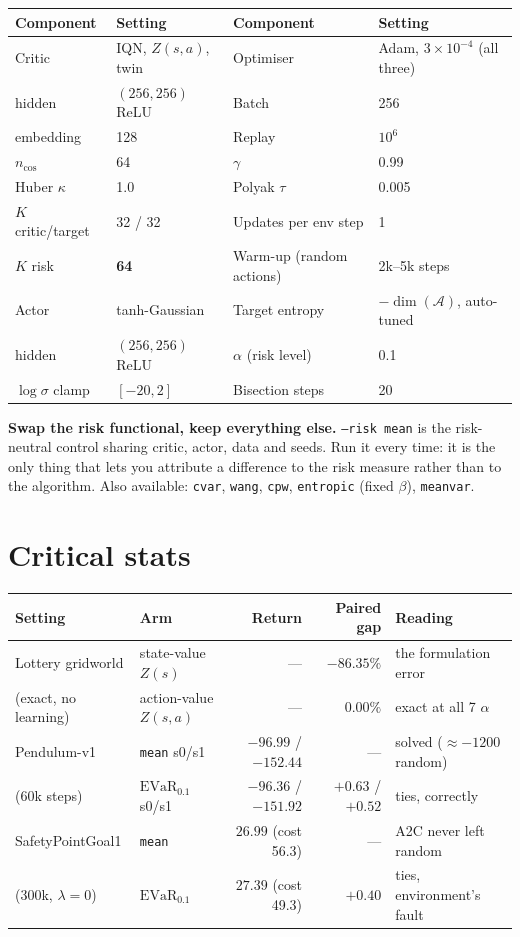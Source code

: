 \documentclass[10pt,a4paper]{article}
\newcommand{\evar}{\mathrm{EVaR}}
\begin{document}
\begin{center}
\small
\begin{tabular}{@{}llll@{}}
\toprule
\textbf{Component} & \textbf{Setting} & \textbf{Component} & \textbf{Setting} \\
\midrule
Critic & IQN, $Z(s,a)$, twin & Optimiser & Adam, $3\times10^{-4}$ (all three) \\
\quad hidden & $(256,256)$ ReLU & Batch & 256 \\
\quad embedding & 128 & Replay & $10^{6}$ \\
\quad $n_{\cos}$ & 64 & $\gamma$ & 0.99 \\
\quad Huber $\kappa$ & 1.0 & Polyak $\tau$ & 0.005 \\
\quad $K$ critic/target & 32 / 32 & Updates per env step & 1 \\
\quad $K$ risk & \textbf{64} & Warm-up (random actions) & 2k--5k steps \\
Actor & tanh-Gaussian & Target entropy & $-\dim(\mathcal{A})$, auto-tuned \\
\quad hidden & $(256,256)$ ReLU & $\alpha$ (risk level) & 0.1 \\
\quad $\log\sigma$ clamp & $[-20, 2]$ & Bisection steps & 20 \\
\bottomrule
\end{tabular}
\end{center}

\textbf{Swap the risk functional, keep everything else.} \texttt{--risk mean} is the
risk-neutral control sharing critic, actor, data and seeds. Run it every time: it is
the only thing that lets you attribute a difference to the risk measure rather than
to the algorithm. Also available: \texttt{cvar}, \texttt{wang}, \texttt{cpw},
\texttt{entropic} (fixed $\beta$), \texttt{meanvar}.

\section{Critical stats}

\begin{center}
\small
\begin{tabular}{@{}llrrl@{}}
\toprule
\textbf{Setting} & \textbf{Arm} & \textbf{Return} & \textbf{Paired gap} & \textbf{Reading} \\
\midrule
Lottery gridworld & state-value $Z(s)$ & --- & $-86.35\%$ & the formulation error \\
(exact, no learning) & action-value $Z(s,a)$ & --- & $\mathbf{0.00\%}$ & exact at all 7 $\alpha$ \\
\midrule
Pendulum-v1 & \texttt{mean} s0/s1 & $-96.99$ / $-152.44$ & --- & solved ($\approx-1200$ random) \\
(60k steps) & $\evar_{0.1}$ s0/s1 & $-96.36$ / $-151.92$ & $+0.63$ / $+0.52$ & ties, correctly \\
\midrule
SafetyPointGoal1 & \texttt{mean} & $26.99$ (cost 56.3) & --- & A2C never left random \\
(300k, $\lambda=0$) & $\evar_{0.1}$ & $27.39$ (cost 49.3) & $+0.40$ & ties, environment's fault \\
\bottomrule
\end{tabular}
\end{center}
\end{document}
